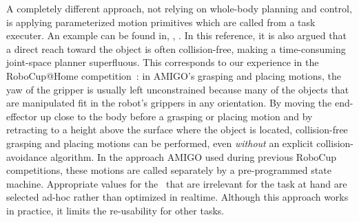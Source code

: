 A completely different approach, not relying on whole-body planning and control, is applying parameterized motion primitives which are called from a task executer.
An example can be found in, \eg, \citet{Stuckler2012}. In this reference, it is also argued that a direct reach toward the object is often collision-free, making a time-consuming joint-space planner superfluous.
%
This corresponds to our experience in the RoboCup@Home competition~\citep{Wisspeintner2009}: in AMIGO's \citep{Lunenburg2014} grasping and placing motions, the yaw of the gripper is usually left unconstrained because many of the objects that are manipulated fit in the robot's grippers in any orientation. By moving the end-effector up close to the body before a grasping or placing motion and by retracting to a height above the surface where the object is located, collision-free grasping and placing motions can be performed, even \emph{without} an explicit collision-avoidance algorithm.
In the approach AMIGO used during previous RoboCup competitions, these motions are called separately by a pre-programmed state machine. 
Appropriate values for the \dofs\ that are irrelevant for the task at hand are selected ad-hoc rather than optimized in realtime. Although this approach works in practice, it limits the re-usability for other tasks.

